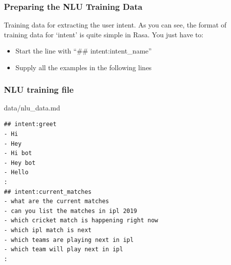 



 \begin{frame}[fragile]\frametitle{Preparing the NLU Training Data}
Training data for extracting the user intent. As you can see, the format of training data for ‘intent’ is quite simple in Rasa. You just have to:
\begin{itemize}
\item Start the line with “\#\# intent:intent\_name”
\item Supply all the examples in the following lines
\end{itemize}

\end{frame}

 \begin{frame}[fragile]\frametitle{NLU training file}
data/nlu\_data.md

\begin{lstlisting}
## intent:greet
- Hi
- Hey
- Hi bot
- Hey bot
- Hello
:
## intent:current_matches
- what are the current matches
- can you list the matches in ipl 2019
- which cricket match is happening right now
- which ipl match is next
- which teams are playing next in ipl
- which team will play next in ipl
:
\end{lstlisting}
\end{frame}

